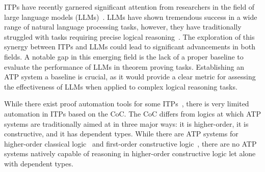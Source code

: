 \documentclass[11pt]{article}
\theoremstyle{definition}
\theoremstyle{definition}
\theoremstyle{definition}
\theoremstyle{definition}
\theoremstyle{definition}
\theoremstyle{definition}
\theoremstyle{definition}
\begin{document}
	ITPs have recently garnered significant attention from researchers in the field of large language models (LLMs)~\cite{jiang2022draft,jiang2022thor,yang2023leandojo,polu2020generative}. LLMs have shown tremendous success in a wide range of natural language processing tasks, however, they have traditionally struggled with tasks requiring precise logical reasoning~\cite{chen2023learning,xu2023large}. The exploration of this synergy between ITPs and LLMs could lead to significant advancements in both fields. A notable gap in this emerging field is the lack of a proper baseline to evaluate the performance of LLMs in theorem proving tasks. Establishing an ATP system a baseline is crucial, as it would provide a clear metric for assessing the effectiveness of LLMs when applied to complex logical reasoning tasks.

	While there exist proof automation tools for some ITPs~\cite{blanchette2011automatic}, there is very limited automation in ITPs based on the CoC. The CoC differs from logics at which ATP systems are traditionally aimed at in three major ways: it is higher-order, it is constructive, and it has dependent types. While there are ATP systems for higher-order classical logic~\cite{bentkamp2021superposition} and first-order constructive logic~\cite{otten2008leancop}, there are no ATP systems natively capable of reasoning in higher-order constructive logic let alone with dependent types.
\end{document}
